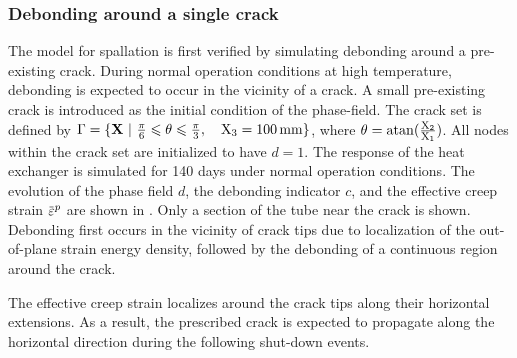 

\subsubsection{Debonding around a single crack}

The model for spallation is first verified by simulating debonding around a pre-existing crack. During normal operation conditions at high temperature, debonding is expected to occur in the vicinity of a crack.
A small pre-existing crack is introduced as the initial condition of the phase-field. The crack set is defined by $\Gamma = \{ \textbf{X} \ \vert\ \frac{\pi}{6} \leqslant \theta \leqslant \frac{\pi}{3}, \quad \text{X}_3 = \SI{100}{\milli\meter} \}$, where $\theta = \operatorname{atan}(\frac{\text{X}_2}{\text{X}_1})$.
All nodes within the crack set are initialized to have $d = 1$.
The response of the heat exchanger is simulated for 140 days under normal operation conditions. The evolution of the phase field $d$, the debonding indicator $c$, and the effective creep strain $\ep$ are shown in . Only a section of the tube near the crack is shown. Debonding first occurs in the vicinity of crack tips due to localization of the out-of-plane strain energy density, followed by the debonding of a continuous region around the crack.



The effective creep strain localizes around the crack tips along their horizontal extensions. As a result, the prescribed crack is expected to propagate along the horizontal direction during the following shut-down events.

